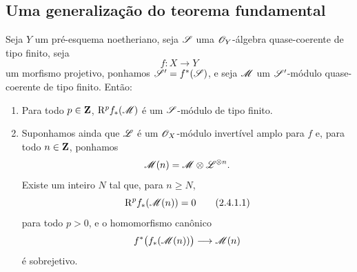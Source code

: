 \subsection{Uma generalização do teorema fundamental}
\label{subsection:III.2.4}

\begin{theorem}[2.4.1]
\label{III.2.4.1}
Seja $Y$ um pré-esquema noetheriano, seja $\mathscr{S}$ uma $\mathscr{O}_Y$-álgebra quase-coerente de tipo finito, seja
\[
  f:X\longrightarrow Y
\]
um morfismo projetivo, ponhamos $\mathscr{S}'=f^*(\mathscr{S})$, e seja $\mathscr{M}$ um $\mathscr{S}'$-módulo quase-coerente de tipo finito.
Então:
\begin{enumerate}
  \item[(i) ] Para todo $p\in\mathbf Z$, $\mathrm{R}^p f_*(\mathscr{M})$ é um $\mathscr{S}$-módulo de tipo finito.

  \item[(ii) ] Suponhamos ainda que $\mathscr{L}$ é um $\mathscr{O}_X$-módulo invertível amplo para $f$ e, para todo $n\in\mathbf Z$, ponhamos
  \[
    \mathscr{M}(n)=\mathscr{M}\otimes\mathscr{L}^{\otimes n}.
  \]
  Existe um inteiro $N$ tal que, para $n\geq N$,
  \[
  \label{III.2.4.1.1}
    \RR^p f_*(\sh{M}(n))=0
    \tag{2.4.1.1}
  \]
  para todo $p>0$, e o homomorfismo canônico
  \[
    f^*\bigl(f_*(\mathscr{M}(n))\bigr)\longrightarrow\mathscr{M}(n)
  \]
   é sobrejetivo.
\end{enumerate}
\end{theorem}


